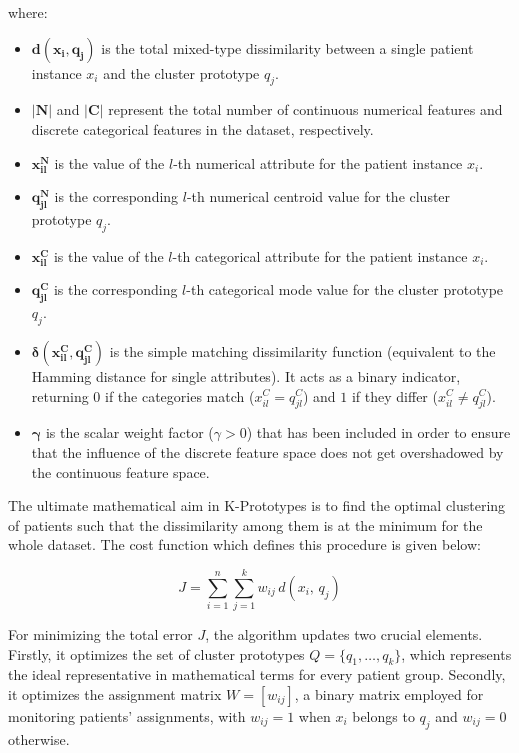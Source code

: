 where:
\begin{itemize}
    \item $\boldsymbol{d(x_i, q_j)}$ is the total mixed-type dissimilarity between a single patient instance $x_i$ and the cluster prototype $q_j$.
    \item $\boldsymbol{|N|}$ and $\boldsymbol{|C|}$ represent the total number of continuous numerical features and discrete categorical features in the dataset, respectively.
    \item $\boldsymbol{x_{il}^N}$ is the value of the $l$-th numerical attribute for the patient instance $x_i$.
    \item $\boldsymbol{q_{jl}^N}$ is the corresponding $l$-th numerical centroid value for the cluster prototype $q_j$.
    \item $\boldsymbol{x_{il}^C}$ is the value of the $l$-th categorical attribute for the patient instance $x_i$.
    \item $\boldsymbol{q_{jl}^C}$ is the corresponding $l$-th categorical mode value for the cluster prototype $q_j$.
    \item $\boldsymbol{\delta(x_{il}^C, q_{jl}^C)}$ is the simple matching dissimilarity function (equivalent to the Hamming distance for single attributes). It acts as a binary indicator, returning $0$ if the categories match ($x_{il}^C = q_{jl}^C$) and $1$ if they differ ($x_{il}^C \neq q_{jl}^C$).
    \item $\boldsymbol{\gamma}$ is the scalar weight factor ($\gamma > 0$) that has been included in order to ensure that the influence of the discrete feature space does not get overshadowed by the continuous feature space.
\end{itemize}

The ultimate mathematical aim in K-Prototypes is to find the optimal clustering of patients such that the dissimilarity among them is at the minimum for the whole dataset. The cost function which defines this procedure is given below:

\begin{equation}
    J = \sum_{i=1}^{n} \sum_{j=1}^{k} w_{ij}\, d(x_i,\, q_j)
    \label{eq:kproto_obj}
\end{equation}

For minimizing the total error $J$, the algorithm updates two crucial elements. Firstly, it optimizes the set of cluster prototypes $Q = \{q_1, \ldots, q_k\}$, which represents the ideal representative in mathematical terms for every patient group. Secondly, it optimizes the assignment matrix $W = [w_{ij}]$, a binary matrix employed for monitoring patients' assignments, with $w_{ij}=1$ when $x_i$ belongs to $q_j$ and $w_{ij}=0$ otherwise.

